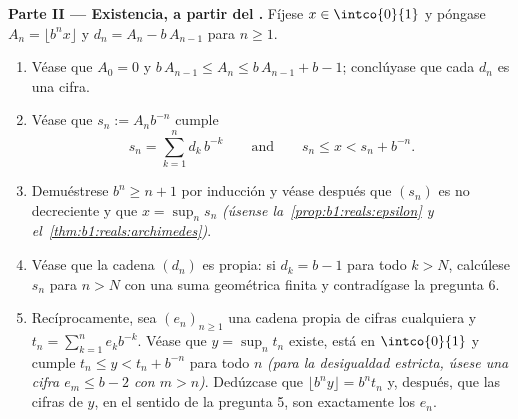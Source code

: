 \begin{problem}
\medskip
\noindent\textbf{Parte II --- Existencia, a partir del .}
Fíjese $x \in \intco{0}{1}$ y póngase $A_n = \lfloor b^n x \rfloor$ y
$d_n = A_n - b\,A_{n-1}$ para $n \geq 1$.
\begin{enumerate}[resume]
  \item Véase que $A_0 = 0$ y $b\,A_{n-1} \leq A_n \leq b\,A_{n-1} +
        b - 1$; conclúyase que cada $d_n$ es una cifra.
  \item Véase que $s_n := A_n b^{-n}$ cumple
        \[
        s_n = \sum_{k=1}^{n} d_k\,b^{-k}
        \qquad\text{and}\qquad
        s_n \leq x < s_n + b^{-n} .
        \]
  \item Demuéstrese $b^n \geq n + 1$ por inducción y véase después que
        $(s_n)$ es no decreciente y que $x = \sup_n s_n$
        \emph{(úsense la~\cref{prop:b1:reals:epsilon} y
        el~\cref{thm:b1:reals:archimedes})}.
  \item Véase que la cadena $(d_n)$ es propia: si $d_k = b - 1$ para
        todo $k > N$, calcúlese $s_n$ para $n > N$ con una suma
        geométrica finita y contradígase la pregunta 6.
  \item Recíprocamente, sea $(e_n)_{n \geq 1}$ una cadena propia de
        cifras cualquiera y $t_n = \sum_{k=1}^n e_k b^{-k}$. Véase que
        $y = \sup_n t_n$ existe, está en $\intco{0}{1}$ y cumple
        $t_n \leq y < t_n + b^{-n}$ para todo $n$ \emph{(para la
        desigualdad estricta, úsese una cifra $e_m \leq b - 2$ con
        $m > n$)}. Dedúzcase que $\lfloor b^n y \rfloor = b^n t_n$ y,
        después, que las cifras de $y$, en el sentido de la
        pregunta 5, son exactamente los $e_n$.
\end{enumerate}


\end{problem}
